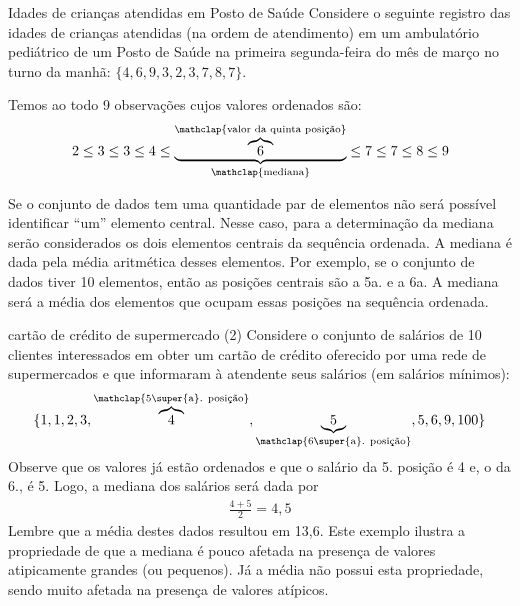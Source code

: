 \begin{example}{Idades de crianças atendidas em Posto de Saúde}
Considere o seguinte registro das idades de crianças atendidas (na ordem de atendimento) em um ambulatório pediátrico de um Posto de Saúde na primeira segunda-feira do mês de março no turno da manhã: \(\{4,6,9,3,2,3,7,8,7\}\). 

Temos ao todo 9 observações cujos valores ordenados são:
\begin{equation*}
\begin{split}2 \leq 3 \leq 3 \leq 4 \leq \underbrace{\overbrace{6}^{\mathclap{{\text{valor da quinta posição}}}}}_{\mathclap{{\text{mediana}}}} \leq 7 \leq 7 \leq 8 \leq 9\end{split}
\end{equation*}
\end{example}
Se o conjunto de dados tem uma quantidade par de elementos não será possível identificar “um”{} elemento central. Nesse caso, para a determinação da mediana serão considerados os dois elementos centrais da sequência ordenada. A mediana é dada pela média aritmética desses elementos. Por exemplo, se o conjunto de dados tiver 10 elementos, então as posições centrais são a 5a. e a 6a. A mediana será a média dos elementos que ocupam essas posições na sequência ordenada.


\begin{example}{cartão de crédito de supermercado (2)}
Considere o conjunto de salários de 10 clientes interessados em obter um cartão de crédito oferecido por uma rede de supermercados e que informaram à atendente seus salários (em salários mínimos):
\begin{equation*}
\begin{split}\{1, 1, 2, 3, \overbrace{4}^{\mathclap{\text{5\super{a}. posição}}}, \underbrace{5}_{\mathclap{\text{6\super{a}. posição}}}, 5, 6, 9, 100\}\end{split}
\end{equation*}
Observe que os valores já estão ordenados e que o salário da 5. posição é 4 e, o da 6., é 5. Logo, a mediana dos salários será dada por
\begin{equation*}
\begin{split}\frac{4+5}{2}=4,5\end{split}
\end{equation*}
Lembre que a média destes dados resultou em 13,6. Este exemplo ilustra a propriedade de que a mediana é pouco afetada na presença de valores atipicamente grandes (ou pequenos). Já a média não possui esta propriedade, sendo muito afetada na presença de valores atípicos.
\end{example}

